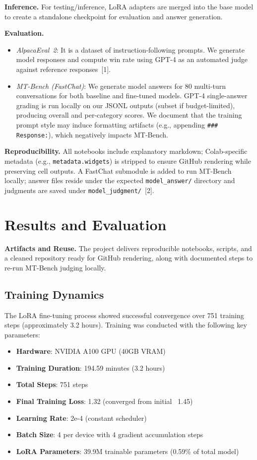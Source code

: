\documentclass{assignment7_report}
\begin{document}
\textbf{Inference.} For testing/inference, LoRA adapters are merged into the base model to create a standalone checkpoint for evaluation and answer generation.

\textbf{Evaluation.} 
\begin{itemize}
  \item \emph{AlpacaEval~2}: It is a dataset of instruction-following prompts. We generate model responses and compute win rate using GPT-4 as an automated judge against reference responses~[1].
  \item \emph{MT-Bench (FastChat)}: We generate model answers for 80 multi-turn conversations for both baseline and fine-tuned models. GPT-4 single-answer grading is run locally on our JSONL outputs (subset if budget-limited), producing overall and per-category scores. We document that the training prompt style may induce formatting artifacts (e.g., appending \texttt{\#\#\# Response:}), which negatively impacts MT-Bench.
\end{itemize}

\textbf{Reproducibility.} All notebooks include explanatory markdown; Colab-specific metadata (e.g., \texttt{metadata.widgets}) is stripped to ensure GitHub rendering while preserving cell outputs. A FastChat submodule is added to run MT-Bench locally; answer files reside under the expected \texttt{model\_answer/} directory and judgments are saved under \texttt{model\_judgment/}~[2].


\section{Results and Evaluation}
\vspace*{-3mm}

\textbf{Artifacts and Reuse.} The project delivers reproducible notebooks, scripts, and a cleaned repository ready for GitHub rendering, along with documented steps to re-run MT-Bench judging locally.

\subsection{Training Dynamics}

The LoRA fine-tuning process showed successful convergence over 751 training steps (approximately 3.2 hours). Training was conducted with the following key parameters:

\begin{itemize}
\item \textbf{Hardware}: NVIDIA A100 GPU (40GB VRAM)
\item \textbf{Training Duration}: 194.59 minutes (3.2 hours)
\item \textbf{Total Steps}: 751 steps
\item \textbf{Final Training Loss}: 1.32 (converged from initial ~1.45)
\item \textbf{Learning Rate}: 2e-4 (constant scheduler)
\item \textbf{Batch Size}: 4 per device with 4 gradient accumulation steps
\item \textbf{LoRA Parameters}: 39.9M trainable parameters (0.59\% of total model)
\end{itemize}
\end{document}
